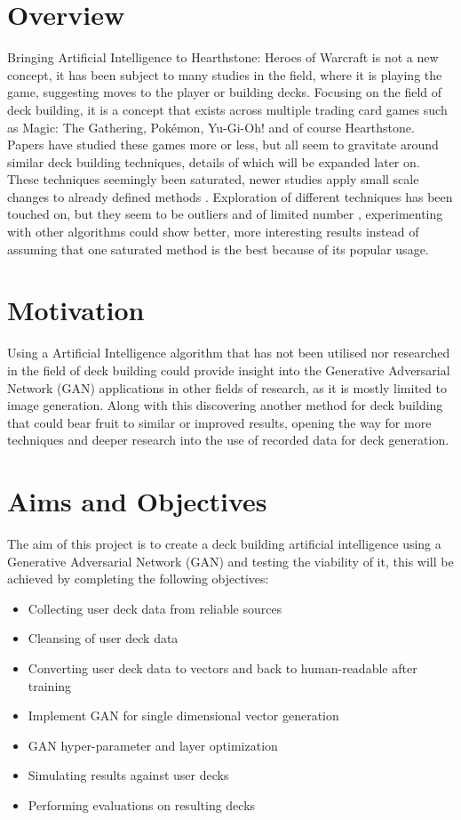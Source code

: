 \documentclass{report} %
\begin{document}
\section{Overview}
Bringing Artificial Intelligence to Hearthstone: Heroes of Warcraft is not a new concept, it has been subject to many studies in the field, where it is playing the game, suggesting moves to the player or building decks. Focusing on the field of deck building, it is a concept that exists across multiple trading card games such as Magic: The Gathering, Pokémon, Yu-Gi-Oh! and of course Hearthstone. Papers have studied these games more or less, but all seem to gravitate around similar deck building techniques, details of which will be expanded later on. These techniques seemingly been saturated, newer studies apply small scale changes to already defined methods \cite{Back1996}. Exploration of different techniques has been touched on, but they seem to be outliers and of limited number \cite{Ward2020}, experimenting with other algorithms could show better, more  interesting results instead of assuming that one saturated method is the best because of its popular usage.
\section{Motivation}
Using a Artificial Intelligence algorithm that has not been utilised nor researched in the field of deck building could provide insight into the Generative Adversarial Network (GAN) applications in other fields of research, as it is mostly limited to image generation. Along with this discovering another method for deck building that could bear fruit to similar or improved results, opening the way for more techniques and deeper research into the use of recorded data for deck generation.
\section{Aims and Objectives}
The aim of this project is to create a deck building artificial intelligence using a Generative Adversarial Network (GAN) and testing the viability of it, this will be achieved by completing the following objectives:
\begin{itemize}
 \item Collecting user deck data from reliable sources
 \item Cleansing of user deck data
 \item Converting user deck data to vectors and back to human-readable after training
 \item Implement GAN for single dimensional vector generation
 \item GAN hyper-parameter and layer optimization
 \item Simulating results against user decks
 \item Performing evaluations on resulting decks
\end{itemize}
\end{document}
